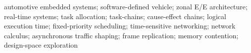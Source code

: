 \medskip{}\hspace{0.4em}%
automotive embedded systems; software-defined vehicle; zonal E/E
architecture; real-time systems; task allocation; task-chains; cause-effect
chains;
logical execution time; fixed-priority scheduling; time-sensitive
networking; network calculus; asynchronous traffic shaping; frame
replication; memory contention; design-space exploration
